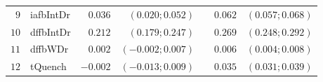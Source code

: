 \begin{table*}[!ht]
\begin{tabular*}{\textwidth}{@{}rlrrrrr@{}}
\footnotesize{$9 $} & \footnotesize{iafbIntDr} & \footnotesize{$0.036$}   & \footnotesize{$(0.020;0.052)$}  && \footnotesize{$0.062$} & \footnotesize{$(0.057;0.068)$} \\
\footnotesize{$10$} & \footnotesize{dffbIntDr} & \footnotesize{$0.212$}   & \footnotesize{$(0.179;0.247)$}  && \footnotesize{$0.269$} & \footnotesize{$(0.248;0.292)$} \\
\footnotesize{$11$} & \footnotesize{dffbWDr  } & \footnotesize{$0.002$}   & \footnotesize{$(-0.002;0.007)$} && \footnotesize{$0.006$} & \footnotesize{$(0.004;0.008)$} \\
\footnotesize{$12$} & \footnotesize{tQuench  } & \footnotesize{$-0.002$}  & \footnotesize{$(-0.013;0.009)$} && \footnotesize{$0.035$} & \footnotesize{$(0.031;0.039)$} \\

\bottomrule
\end{tabular*}
\end{table*}

